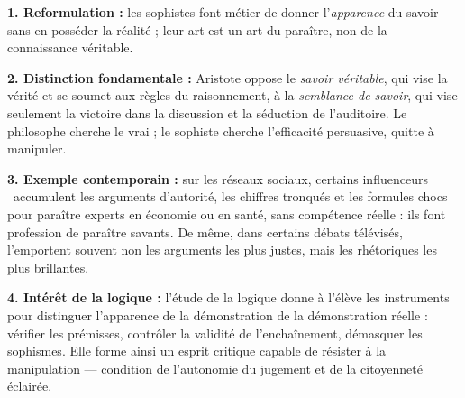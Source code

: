 \documentclass[11pt]{article}
\begin{document}
\begin{corrige}
\textbf{1. Reformulation :} les sophistes font métier de donner l'\emph{apparence} du savoir sans en posséder la réalité ; leur art est un art du paraître, non de la connaissance véritable.

\textbf{2. Distinction fondamentale :} Aristote oppose le \emph{savoir véritable}, qui vise la vérité et se soumet aux règles du raisonnement, à la \emph{semblance de savoir}, qui vise seulement la victoire dans la discussion et la séduction de l'auditoire. Le philosophe cherche le vrai ; le sophiste cherche l'efficacité persuasive, quitte à manipuler.

\textbf{3. Exemple contemporain :} sur les réseaux sociaux, certains \guillemotleft influenceurs \guillemotright\ accumulent les arguments d'autorité, les chiffres tronqués et les formules chocs pour paraître experts en économie ou en santé, sans compétence réelle : ils font profession de paraître savants. De même, dans certains débats télévisés, l'emportent souvent non les arguments les plus justes, mais les rhétoriques les plus brillantes.

\textbf{4. Intérêt de la logique :} l'étude de la logique donne à l'élève les instruments pour distinguer l'apparence de la démonstration de la démonstration réelle : vérifier les prémisses, contrôler la validité de l'enchaînement, démasquer les sophismes. Elle forme ainsi un esprit critique capable de résister à la manipulation --- condition de l'autonomie du jugement et de la citoyenneté éclairée.
\end{corrige}
\end{document}

